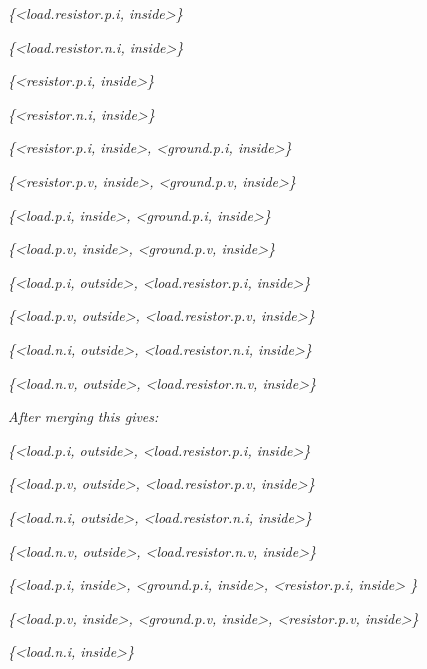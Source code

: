\documentclass[10pt,a4paper]{report}
\begin{document}
\emph{\{\textless{}load.resistor.p.i, inside\textgreater{}\}}

\emph{\{\textless{}load.resistor.n.i, inside\textgreater{}\}}

\emph{\{\textless{}resistor.p.i, inside\textgreater{}\}}

\emph{\{\textless{}resistor.n.i, inside\textgreater{}\}}

\emph{\{\textless{}resistor.p.i, inside\textgreater{},
\textless{}ground.p.i, inside\textgreater{}\}}

\emph{\{\textless{}resistor.p.v, inside\textgreater{},
\textless{}ground.p.v, inside\textgreater{}\}}

\emph{\{\textless{}load.p.i, inside\textgreater{},
\textless{}ground.p.i, inside\textgreater{}\}}

\emph{\{\textless{}load.p.v, inside\textgreater{},
\textless{}ground.p.v, inside\textgreater{}\}}

\emph{\{\textless{}load.p.i, outside\textgreater{},
\textless{}load.resistor.p.i, inside\textgreater{}\}}

\emph{\{\textless{}load.p.v, outside\textgreater{},
\textless{}load.resistor.p.v, inside\textgreater{}\}}

\emph{\{\textless{}load.n.i, outside\textgreater{},
\textless{}load.resistor.n.i, inside\textgreater{}\}}

\emph{\{\textless{}load.n.v, outside\textgreater{},
\textless{}load.resistor.n.v, inside\textgreater{}\}}

\emph{After merging this gives:}

\emph{\{\textless{}load.p.i, outside\textgreater{},
\textless{}load.resistor.p.i, inside\textgreater{}\}}

\emph{\{\textless{}load.p.v, outside\textgreater{},
\textless{}load.resistor.p.v, inside\textgreater{}\}}

\emph{\{\textless{}load.n.i, outside\textgreater{},
\textless{}load.resistor.n.i, inside\textgreater{}\}}

\emph{\{\textless{}load.n.v, outside\textgreater{},
\textless{}load.resistor.n.v, inside\textgreater{}\}}

\emph{\{\textless{}load.p.i, inside\textgreater{},
\textless{}ground.p.i, inside\textgreater{}, \textless{}resistor.p.i,
inside\textgreater{} \}}

\emph{\{\textless{}load.p.v, inside\textgreater{},
\textless{}ground.p.v, inside\textgreater{}, \textless{}resistor.p.v,
inside\textgreater{}\}}

\emph{\{\textless{}load.n.i, inside\textgreater{}\}}
\end{document}
